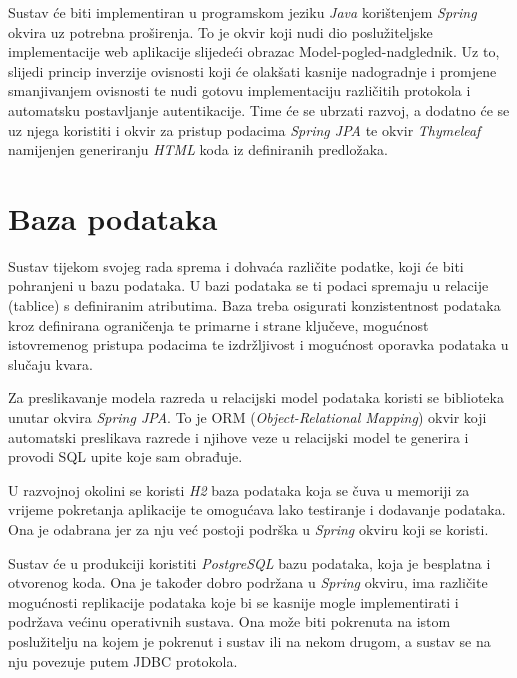 		Sustav će biti implementiran u programskom jeziku \textit{Java} korištenjem \textit{Spring} okvira uz potrebna proširenja. To je okvir koji nudi dio poslužiteljske implementacije web aplikacije slijedeći obrazac Model-pogled-nadglednik. Uz to, slijedi princip inverzije ovisnosti koji će olakšati kasnije nadogradnje i promjene smanjivanjem ovisnosti te nudi gotovu implementaciju različitih protokola i automatsku postavljanje autentikacije. Time će se ubrzati razvoj, a dodatno će se uz njega koristiti i okvir za pristup podacima \textit{Spring JPA} te okvir \textit{Thymeleaf} namijenjen generiranju \textit{HTML} koda iz definiranih predložaka.
		
		\eject

		

				
		\section{Baza podataka}
			
%			

		Sustav tijekom svojeg rada sprema i dohvaća različite podatke, koji će biti pohranjeni u bazu podataka. U bazi podataka se ti podaci spremaju u relacije (tablice) s definiranim atributima. Baza treba osigurati konzistentnost podataka kroz definirana ograničenja te primarne i strane ključeve, mogućnost istovremenog pristupa podacima te izdržljivost i mogućnost oporavka podataka u slučaju kvara.
		
		Za preslikavanje modela razreda u relacijski model podataka koristi se biblioteka  unutar okvira \textit{Spring JPA}. To je ORM (\textit{Object-Relational Mapping}) okvir koji automatski preslikava razrede i njihove veze u relacijski model te generira i provodi SQL upite koje sam obrađuje.
		
		U razvojnoj okolini se koristi \textit{H2} baza podataka koja se čuva u memoriji za vrijeme pokretanja aplikacije te omogućava lako testiranje i dodavanje podataka. Ona je odabrana jer za nju već postoji podrška u \textit{Spring} okviru koji se koristi.
		
		Sustav će u produkciji koristiti \textit{PostgreSQL} bazu podataka, koja je besplatna i otvorenog koda. Ona je također dobro podržana u \textit{Spring} okviru, ima različite mogućnosti replikacije podataka koje bi se kasnije mogle implementirati i podržava većinu operativnih sustava. Ona može biti pokrenuta na istom poslužitelju na kojem je pokrenut i sustav ili na nekom drugom, a sustav se na nju povezuje putem JDBC protokola.
		
